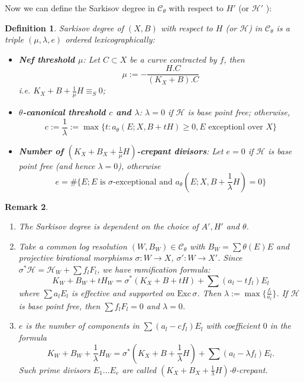 \documentclass{article}
\newtheorem{defn}{Definition}[subsection]
\newtheorem{rmk}[defn]{Remark}
\begin{document}
Now we can define the Sarkisov degree in $\mathcal{C}_{\theta}$ with respect to $H'$ (or $\mathcal{H}'$ ):
\begin{defn}\label{sarkisovdegree}
  \cite[Definition 3.8]{brunoLogSarkisovProgram1995}
  Sarkisov degree of $ (X,B) $ with respect to $ H $ (or $ \mathcal{H} $) in $ \mathcal{C}_\theta $ is a triple $ (\mu,\lambda,e) $ ordered lexicographically:
  \begin{itemize}
    \item \textbf{Nef threshold $ \mu $}: Let $ C\subset X  $ be a curve contracted by $ f $, then 
      \[ \mu:=-\frac{H.C}{(K_X+B).C} \]
      i.e. $ K_X+B+\frac{1}{\mu} H \equiv_S0$;
    \item \textbf{$ \theta $-canonical threshold $c$ and $ \lambda $}: $\lambda=0$ if $ \mathcal{H} $ is base point free; otherwise,
      \[ c:=\frac{1}{\lambda}:=\max\{t:a_{\theta}(E;X,B+tH)\geqslant 0 ,E\text{ exceptionl over }X \}\] 
    \item \textbf{Number of $(K_{X}+B_{X}+\frac{1}{\mu}H)$-crepant divisors}: Let $ e=0 $ if $ \mathcal{H} $ is base point free (and hence $ \lambda=0 $), otherwise 
      \[ e=\#\{E; E \text{ is }\sigma\text{-exceptional and } a_{\theta}(E;X,B+\frac{1}{\lambda} H)=0 \} \]
  \end{itemize}
\end{defn}
\begin{rmk} 
 \begin{enumerate}
    \item  The Sarkisov degree is dependent on the choice of  $A', H'$ and  $\theta$.
   \item Take a common log resolution  $ (W,B_W)\in \mathcal{C}_\theta $ with $ B_W=\sum \theta(E)E $ and projective birational morphisms $ \sigma:W\to X $, $ \sigma':W\to X' $. Since $\sigma^*\mathcal{H}=\mathcal{H}_W+\sum f_{l}F_{l}$, we have ramification formula:
      \[ K_W+B_W+tH_W=\sigma^*(K_X+B+tH)+\sum(a_l-tf_l)E_l \]
      where $ \sum a_lE_l $ is effective and supported on $ \mathrm{Exc}\,\sigma $. Then $\lambda:=\max\{ \frac{f_l}{a_l}\}$. If $ \mathcal{H} $ is base point free, then $ \sum f_lF_l=0 $ and $\lambda=0  $.
      \item   $ e $ is the number of components in $\sum(a_l-cf_l)E_l$ with coefficient $ 0 $ in the formula
      \[ K_W+B_W+\frac{1}{\lambda} H_W=\sigma^*(K_X+B+\frac{1}{\lambda} H)+\sum(a_l-\lambda f_l)E_l .\]
      Such prime divisors $E_{1}\ldots E_{e}$ are called $(K_{X}+B_{X}+\frac{1}{\lambda}H)$-$\theta$-crepant.
 \end{enumerate} 
\end{rmk}
\end{document}
